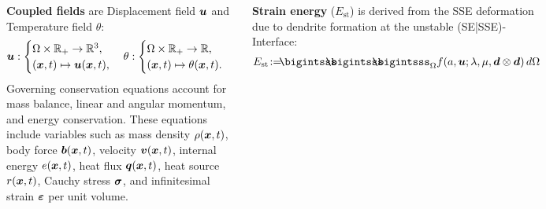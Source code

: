 \documentclass[25pt, a0paper,
portrait,
margin=2mm, 
innermargin=2mm, 
blockverticalspace=7mm, %
colspace=2mm, %
subcolspace=0mm]{tikzposter}
\makeatletter
\newcommand*{\inputfig}[3][htb]{{
    \def\fps@figure{#1}
    \def\DIR{#2}
    \def\LABEL{#3}
    \graphicspath{{\DIR/}}
    
}}
\makeatother
\begin{document}
\begin{columns}
	{
		\begin{minipage}{0.35\textwidth}
			\begin{mdframed}
				\begin{center}
					\inputfig{floats/structuralfivefields_multi_edited}{structuralfivefields_multi_edited}
				\end{center}
				\vspace{-14mm}
			\end{mdframed}
			\begin{mdframed}
				\textbf{Coupled fields} are  
				Displacement field ${\boldsymbol{\mathnormal u}}$ and Temperature field $\theta$:
				\begin{align*}
					{\boldsymbol{\mathnormal u}}:
					\begin{cases}
						\Omega \times \mathbb{R}_{+} \rightarrow \mathbb{R}^3, \\
						({\boldsymbol{\mathnormal x}},t) \mapsto {\boldsymbol{\mathnormal u}}({\boldsymbol{\mathnormal x}},t),
					\end{cases}
					\theta:
					\begin{cases}
						\Omega \times \mathbb{R}_{+} \rightarrow \mathbb{R}, \\
						({\boldsymbol{\mathnormal x}},t) \mapsto \theta({\boldsymbol{\mathnormal x}},t).
					\end{cases}
				\end{align*}
				Governing conservation equations
				account for mass balance, 
				linear and angular momentum,
				and energy conservation.
				These equations include variables such as
				mass density $\rho({\boldsymbol{\mathnormal x}},t)$, 
				body force ${\boldsymbol{\mathnormal b}}({\boldsymbol{\mathnormal x}},t)$,
				velocity ${\boldsymbol{\mathnormal v}}({\boldsymbol{\mathnormal x}},t)$,
				internal energy $e({\boldsymbol{\mathnormal x}},t)$, 
				heat flux ${\boldsymbol{\mathnormal q}}({\boldsymbol{\mathnormal x}},t)$,
				heat source $r({\boldsymbol{\mathnormal x}},t)$,
				Cauchy stress ${\boldsymbol{\sigma}}$, and
				infinitesimal strain ${\boldsymbol{\varepsilon}}$
				per unit volume.
				\vspace{-12mm}
			\end{mdframed}
			\begin{minipage}{0.5\textwidth}
				\begin{mdframed}
					\textbf{Strain energy} ($E_{\text{st}}$) is derived from the 
					SSE deformation due to
					dendrite formation 
					at the unstable (SE|SSE)-Interface:
					\begin{align*}
						E_{\text{st}} \! := \!\!\!
						\bigintsss\!\!\!\!\!\!\bigintsss\!\!\!\!\!\!\bigintsss_{\Omega}
						f(a,\bm{u};\lambda,\mu,\bm{d}\otimes\bm{d}) \, d\Omega 
					\end{align*}
				\end{mdframed}

\end{minipage}
\end{minipage}}
\end{columns}
\end{document}
